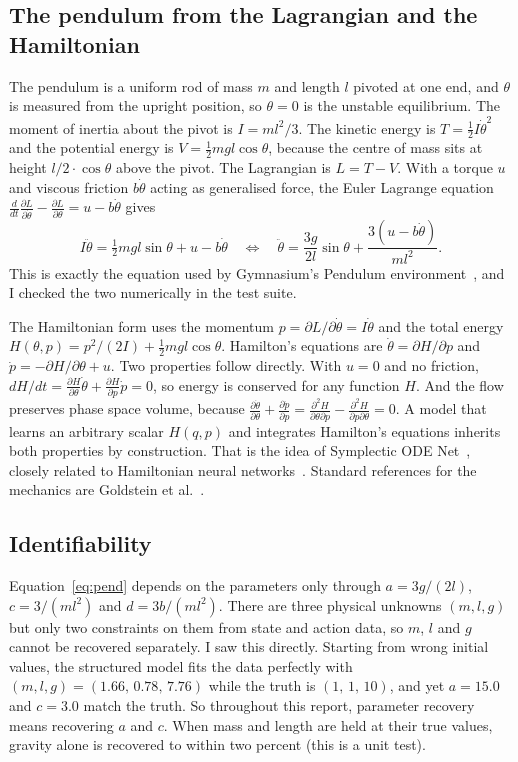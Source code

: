 \documentclass[11pt,a4paper]{article}
\begin{document}
\subsection{The pendulum from the Lagrangian and the Hamiltonian}
The pendulum is a uniform rod of mass $m$ and length $l$ pivoted at one end, and $\theta$ is measured from the upright position, so $\theta=0$ is the unstable equilibrium. The moment of inertia about the pivot is $I=ml^2/3$. The kinetic energy is $T=\tfrac12 I\dot\theta^2$ and the potential energy is $V=\tfrac12 mgl\cos\theta$, because the centre of mass sits at height $l/2\cdot\cos\theta$ above the pivot. The Lagrangian is $L=T-V$. With a torque $u$ and viscous friction $b\dot\theta$ acting as generalised force, the Euler Lagrange equation $\frac{d}{dt}\frac{\partial L}{\partial\dot\theta}-\frac{\partial L}{\partial\theta}=u-b\dot\theta$ gives
\begin{equation}
I\ddot\theta=\tfrac12 mgl\sin\theta+u-b\dot\theta
\quad\Longleftrightarrow\quad
\ddot\theta=\frac{3g}{2l}\sin\theta+\frac{3(u-b\dot\theta)}{ml^2}.
\label{eq:pend}
\end{equation}
This is exactly the equation used by Gymnasium's Pendulum environment~\cite{towers2024gymnasium}, and I checked the two numerically in the test suite.

The Hamiltonian form uses the momentum $p=\partial L/\partial\dot\theta=I\dot\theta$ and the total energy $H(\theta,p)=p^2/(2I)+\tfrac12 mgl\cos\theta$. Hamilton's equations are $\dot\theta=\partial H/\partial p$ and $\dot p=-\partial H/\partial\theta+u$. Two properties follow directly. With $u=0$ and no friction, $dH/dt=\frac{\partial H}{\partial\theta}\dot\theta+\frac{\partial H}{\partial p}\dot p=0$, so energy is conserved for any function $H$. And the flow preserves phase space volume, because $\frac{\partial\dot\theta}{\partial\theta}+\frac{\partial\dot p}{\partial p}=\frac{\partial^2H}{\partial\theta\partial p}-\frac{\partial^2H}{\partial p\partial\theta}=0$. A model that learns an arbitrary scalar $H(q,p)$ and integrates Hamilton's equations inherits both properties by construction. That is the idea of Symplectic ODE Net~\cite{zhong2020symoden}, closely related to Hamiltonian neural networks~\cite{greydanus2019hnn}. Standard references for the mechanics are Goldstein et al.~\cite{goldstein2002}.

\subsection{Identifiability}
Equation~\eqref{eq:pend} depends on the parameters only through $a=3g/(2l)$, $c=3/(ml^2)$ and $d=3b/(ml^2)$. There are three physical unknowns $(m,l,g)$ but only two constraints on them from state and action data, so $m$, $l$ and $g$ cannot be recovered separately. I saw this directly. Starting from wrong initial values, the structured model fits the data perfectly with $(m,l,g)=(1.66,\,0.78,\,7.76)$ while the truth is $(1,\,1,\,10)$, and yet $a=15.0$ and $c=3.0$ match the truth. So throughout this report, parameter recovery means recovering $a$ and $c$. When mass and length are held at their true values, gravity alone is recovered to within two percent (this is a unit test).
\end{document}
